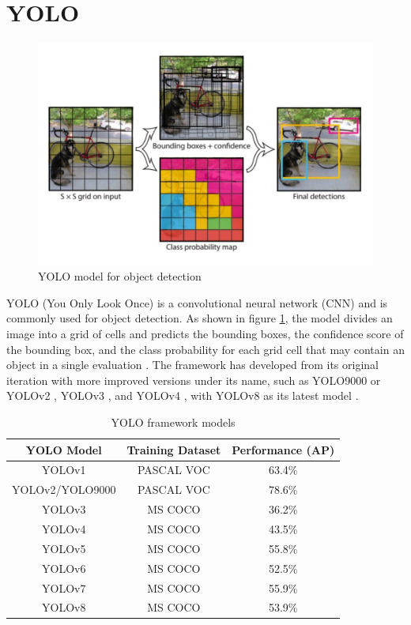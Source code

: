 \section{YOLO} \label{yolo}

\begin{figure}[!htbp]
    \centering
    \centerline{\includegraphics[width=0.8\linewidth]{images/yolo_object_detection.jpg}}
    \caption{YOLO model for object detection \cite{redmonYouOnlyLook2016}}
    \label{fig:yolo_diagram}
\end{figure}
YOLO (You Only Look Once) is a convolutional neural network (CNN) and is commonly used for object detection. As shown in figure \ref{fig:yolo_diagram}, the model divides an image into a grid of cells and predicts the bounding boxes, the confidence score of the bounding box, and the class probability for each grid cell that may contain an object in a single evaluation \cite{redmonYouOnlyLook2016}. The framework has developed from its original iteration with more improved versions under its name, such as YOLO9000 or YOLOv2 \cite{redmonYOLO9000BetterFaster2016}, YOLOv3 \cite{redmonYOLOv3IncrementalImprovement2018}, and YOLOv4 \cite{bochkovskiyYOLOv4OptimalSpeed2020}, with YOLOv8 as its latest model \cite{jocherYOLOUltralytics2023}.

\begin{table}[!htbp]
    \centering
    \caption{YOLO framework models}
    \resizebox{0.8\linewidth}{!}
    {
    \begin{tabular}{c c c}
        \hline
        YOLO Model & Training Dataset & Performance (AP)  \\
        \hline
        YOLOv1 & PASCAL VOC & {63.4\%}  \\
        \hline
        YOLOv2/YOLO9000 & PASCAL VOC & 78.6\% \\
        \hline
        YOLOv3 & MS COCO & 36.2\% \\
        \hline
        YOLOv4 & MS COCO & 43.5\% \\
        \hline
        YOLOv5 & MS COCO & 55.8\%\\
        \hline
        YOLOv6 & MS COCO & 52.5\% \\
        \hline
        YOLOv7 & MS COCO & 55.9\% \\
        \hline
        YOLOv8 & MS COCO & 53.9\% \\
        \hline
    \end{tabular}
    }
    \label{tab:yolo1-8}
\end{table}

